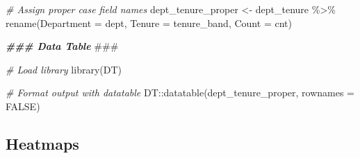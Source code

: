 \documentclass[
]{book}
\newenvironment{Shaded}{\begin{snugshade}}{\end{snugshade}}
\newcommand{\AlertTok}[1]{\textcolor[rgb]{0.94,0.16,0.16}{#1}}
\newcommand{\AttributeTok}[1]{\textcolor[rgb]{0.77,0.63,0.00}{#1}}
\newcommand{\CommentTok}[1]{\textcolor[rgb]{0.56,0.35,0.01}{\textit{#1}}}
\newcommand{\ConstantTok}[1]{\textcolor[rgb]{0.00,0.00,0.00}{#1}}
\newcommand{\DocumentationTok}[1]{\textcolor[rgb]{0.56,0.35,0.01}{\textbf{\textit{#1}}}}
\newcommand{\FunctionTok}[1]{\textcolor[rgb]{0.00,0.00,0.00}{#1}}
\newcommand{\NormalTok}[1]{#1}
\newcommand{\OtherTok}[1]{\textcolor[rgb]{0.56,0.35,0.01}{#1}}
\newcommand{\SpecialCharTok}[1]{\textcolor[rgb]{0.00,0.00,0.00}{#1}}
\newcommand{\StringTok}[1]{\textcolor[rgb]{0.31,0.60,0.02}{#1}}
\begin{document}
\begin{Shaded}
\begin{Highlighting}[]
\CommentTok{\# Assign proper case field names}
\NormalTok{dept\_tenure\_proper }\OtherTok{\textless{}{-}}\NormalTok{ dept\_tenure }\SpecialCharTok{\%\textgreater{}\%}
                      \FunctionTok{rename}\NormalTok{(}\StringTok{\textquotesingle{}Department\textquotesingle{}} \OtherTok{=}\NormalTok{ dept,}
                             \StringTok{\textquotesingle{}Tenure\textquotesingle{}} \OtherTok{=}\NormalTok{ tenure\_band,}
                             \StringTok{\textquotesingle{}Count\textquotesingle{}} \OtherTok{=}\NormalTok{ cnt)}
\end{Highlighting}
\end{Shaded}

\begin{Shaded}
\begin{Highlighting}[]
\DocumentationTok{\#\#\# Data Table }\AlertTok{\#\#\#}

\CommentTok{\# Load library}
\FunctionTok{library}\NormalTok{(DT)}

\CommentTok{\# Format output with datatable}
\NormalTok{DT}\SpecialCharTok{::}\FunctionTok{datatable}\NormalTok{(dept\_tenure\_proper, }\AttributeTok{rownames =} \ConstantTok{FALSE}\NormalTok{)}
\end{Highlighting}
\end{Shaded}

\hypertarget{heatmaps-1}{%
\subsection{Heatmaps}\label{heatmaps-1}}
\end{document}
